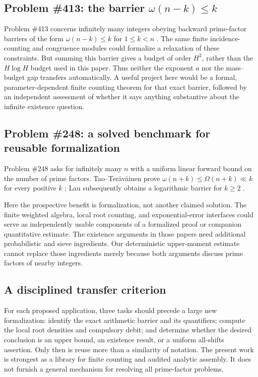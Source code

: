\documentclass[11pt,a4paper]{article}
\theoremstyle{definition}
\theoremstyle{remark}
\numberwithin{equation}{section}
\begin{document}
\subsection{Problem \#413: the barrier \texorpdfstring{$\omega(n-k)\le k$}{omega(n-k) <= k}}
Problem \#413 concerns infinitely many integers obeying backward prime-factor
barriers of the form $\omega(n-k)\le k$ for $1\le k<n$
\citep{Bloom413,TaoTeravainen2026}. The same finite incidence-counting and
congruence modules could formalize a relaxation of these constraints.
But summing this barrier gives a budget of order $H^2$, rather than the
$H\log H$ budget used in this paper. Thus neither the exponent $a$ nor the
mass--budget gap transfers automatically. A useful project here would be a
formal, parameter-dependent finite counting theorem for that exact barrier,
followed by an independent assessment of whether it says anything substantive
about the infinite existence question.

\subsection{Problem \#248: a solved benchmark for reusable formalization}
Problem \#248 asks for infinitely many $n$ with a uniform linear forward bound
on the number of prime factors. Tao--Ter\"av\"ainen prove
$\omega(n+k)\le\Omega(n+k)\ll k$ for every positive $k$
\citep{Bloom248,TaoTeravainen2026}; Lau subsequently obtains a logarithmic
barrier for $k\ge2$ \citep{Lau2026}.

Here the prospective benefit is formalization, not another claimed solution.
The finite weighted algebra, local root counting, and exponential-error
interfaces could serve as independently usable components of a formalized
proof or companion quantitative estimate. The existence arguments in those
papers need additional probabilistic and sieve ingredients. Our deterministic
upper-moment estimate cannot replace those ingredients merely because both
arguments discuss prime factors of nearby integers.

\subsection{A disciplined transfer criterion}
For each proposed application, three tasks should precede a large new
formalization: identify the exact arithmetic barrier and its quantifiers;
compute the local root densities and compulsory debit; and determine whether
the desired conclusion is an upper bound, an existence result, or a uniform
all-shifts assertion. Only then is reuse more than a similarity of notation.
The present work is strongest as a library for finite counting and audited
analytic assembly. It does not furnish a general mechanism for resolving all
prime-factor problems.
\end{document}
